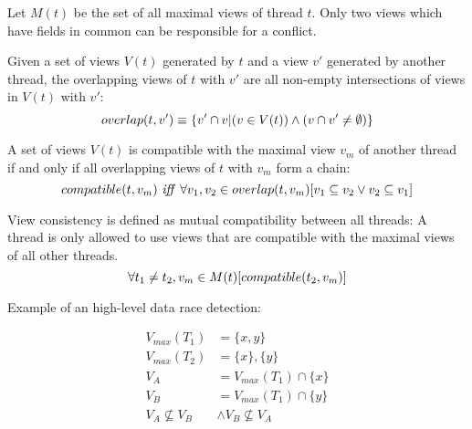 Let $M(t)$ be the set of all maximal views of thread $t$.
Only two views which have fields in common can be responsible for a conflict.

Given a set of views $V(t)$ generated by $t$ and a view $v'$ generated by another thread,
the overlapping views of $t$ with $v'$ are all non-empty intersections of views in $V(t)$ with $v'$:
\begin{equation*}
  \mathnormal{overlap}(t, v') \equiv \{v' \cap v | (v \in V(t)) \wedge (v \cap v' \neq \emptyset)\}
\end{equation*}

A set of views $V(t)$ is compatible with the maximal view $v_m$ of another thread if and only if all overlapping views of $t$ with $v_m$ form a chain:
\begin{equation*}
  \mathnormal{compatible}(t, v_m)~\mathit{iff}~\forall v_1, v_2 \in \mathnormal{overlap}(t, v_m)[v_1 \subseteq v_2 \vee v_2 \subseteq v_1]
\end{equation*}

View consistency is defined as mutual compatibility between all threads:
A thread is only allowed to use views that are compatible with the maximal views of all other threads.
\begin{equation*}
  \forall t_1 \neq t_2, v_m \in M(t)[\mathnormal{compatible}(t_2, v_m)]
\end{equation*}

Example of an high-level data race detection:

\begin{equation}
  \begin{split}
    V_{max}(T_1) & = \{x, y\} \\
    V_{max}(T_2) & = \{x\}, \{y\} \\
    V_A & = V_{max}(T_1) \cap \{x\} \\
    V_B & = V_{max}(T_1) \cap \{y\} \\
    V_A \nsubseteq V_B & \wedge V_B \nsubseteq V_A
  \end{split}
\end{equation}
